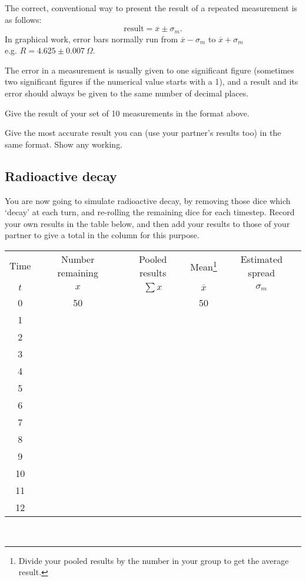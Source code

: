 \begin{questions}
The correct, conventional way to present the result of a repeated measurement is as follows:
\[\text{result}=\overline{x}\pm\sigma_{m}.\]
In graphical work, error bars normally run from $\overline{x}-\sigma_{m}$ to $\overline{x}+\sigma_{m}$\\
e.g. $R=4.625\pm 0.007~\Omega$.

The error in a measurement is usually given to one significant figure (sometimes two significant figures if the numerical value starts with a 1), and a result and its error should always be given to the same number of decimal places.

\question Give the result of your set of 10 measurements in the format above. \answerline

\question Give the most accurate result you can (use your partner's results too) in the same format. Show any working. \fillwithlines{2cm}

\subsection{Radioactive decay}

You are now going to simulate radioactive decay, by removing those dice which `decay' at each turn, and re-rolling the remaining dice for each timestep.  Record your own results in the table below, and then add your results to those of your partner to give a total in the column for this purpose.

\begin{tabular}{|c|c|c|c|c|}
\hline
Time & Number remaining & Pooled results & Mean\footnote{Divide your pooled results by the number in your group to get the average result.} & Estimated spread\\
$t$ & $x$ & $\sum{x}$ & $\overline x$ & $\sigma_{m}$\\
\hline
0 & 50 & & 50 &\\
\hline
1 & &&&\\
\hline
2 & &&&\\
\hline
3 & &&&\\
\hline
4 & &&&\\
\hline
5 & &&&\\
\hline
6 & &&&\\
\hline
7 & &&&\\
\hline
8 & &&&\\
\hline
9 & &&&\\
\hline
10 & &&&\\
\hline
11 & &&&\\
\hline
12 & &&&\\
\hline
\end{tabular}\\


\end{questions}
